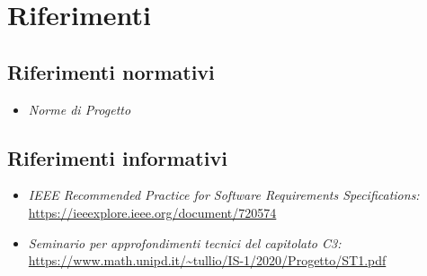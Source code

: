 \section{Riferimenti}
\subsection{Riferimenti normativi}
\begin{itemize}
	\item \textit{Norme di Progetto}
\end{itemize}
\subsection{Riferimenti informativi}
\begin{itemize}
	\item \textit{IEEE Recommended Practice for Software Requirements Specifications:}\\
		\url{https://ieeexplore.ieee.org/document/720574}
	\item \textit{Seminario per approfondimenti tecnici del capitolato C3:}\\
		\url{https://www.math.unipd.it/~tullio/IS-1/2020/Progetto/ST1.pdf}		
\end{itemize}